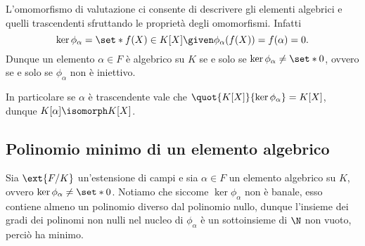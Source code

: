 \begin{remark}
    L'omomorfismo di valutazione ci consente di descrivere gli elementi algebrici e quelli trascendenti sfruttando le proprietà degli omomorfismi. Infatti \[
        \ker \phi_\alpha = \set*{f(X) \in K[X] \given \phi_\alpha(f(X)) = f(\alpha) = 0}.    
    \] Dunque un elemento $\alpha \in F$ è algebrico su $K$ se e solo se $\ker \phi_\alpha \neq \set*{0}$, ovvero se e solo se $\phi_\alpha$ non è iniettivo.

    In particolare se $\alpha$ è trascendente vale che $\quot{K[X]}{\ker \phi_\alpha} = K[X]$, dunque $K[\alpha] \isomorph K[X]$.
\end{remark}

\subsection{Polinomio minimo di un elemento algebrico}
Sia $\ext{F/K}$ un'estensione di campi e sia $\alpha \in F$ un elemento algebrico su $K$, ovvero $\ker \phi_\alpha \neq \set*{0}$.
Notiamo che siccome $\ker \phi_\alpha$ non è banale, esso contiene almeno un polinomio diverso dal polinomio nullo, dunque l'insieme dei gradi dei polinomi non nulli nel nucleo di $\phi_\alpha$ è un sottoinsieme di $\N$ non vuoto, perciò ha minimo.

